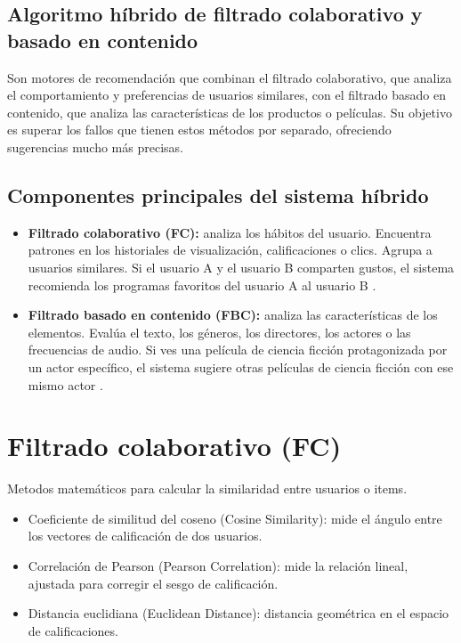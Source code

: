 \documentclass[12pt]{article}
\begin{document}
\subsection{Algoritmo híbrido de filtrado colaborativo y basado en contenido}
Son motores de recomendación que combinan el filtrado colaborativo, que analiza el comportamiento y preferencias de usuarios similares, con el filtrado basado en contenido, que analiza las características de los productos o películas. Su objetivo es superar los fallos que tienen estos métodos por separado, ofreciendo sugerencias mucho más precisas.

\subsection{Componentes principales del sistema híbrido}
\begin{itemize}
\item \textbf{Filtrado colaborativo (FC):} analiza los hábitos del usuario. Encuentra patrones en los historiales de visualización, calificaciones o clics. Agrupa a usuarios similares. Si el usuario A y el usuario B comparten gustos, el sistema recomienda los programas favoritos del usuario A al usuario B \cite{DataMListic-collaborative-filtering}.
\item \textbf{Filtrado basado en contenido (FBC):} analiza las características de los elementos. Evalúa el texto, los géneros, los directores, los actores o las frecuencias de audio. Si ves una película de ciencia ficción protagonizada por un actor específico, el sistema sugiere otras películas de ciencia ficción con ese mismo actor \cite{DataMListic-content-based-recommendation}.
\end{itemize}

\section{Filtrado colaborativo (FC)}
Metodos matemáticos para calcular la similaridad entre usuarios o items.
\begin{itemize}
\item Coeficiente de similitud del coseno (Cosine Similarity): mide el ángulo entre los vectores de calificación de dos usuarios.
\item Correlación de Pearson (Pearson Correlation): mide la relación lineal, ajustada para corregir el sesgo de calificación.
\item Distancia euclidiana (Euclidean Distance): distancia geométrica en el espacio de calificaciones.
\end{itemize}
\end{document}
